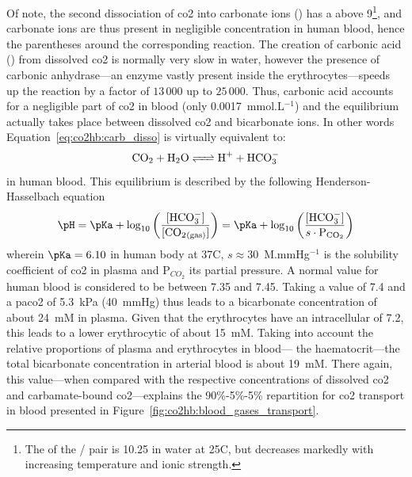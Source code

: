 Of note, the second dissociation of \gls{co2} into carbonate ions () has a \pKa{} above 9\footnote{The \pKa{} of the  /  pair is 10.25 in water at 25{\degree}C, but decreases markedly with increasing temperature and ionic strength\cite{hastings1925, macinnes1933}.}, and carbonate ions are thus present in negligible concentration in human blood, hence the parentheses around the corresponding reaction. The creation of carbonic acid () from dissolved \gls{co2} is normally very slow in water, however the presence of carbonic anhydrase---an enzyme vastly present inside the erythrocytes---speeds up the reaction by a factor of $13\,000$ up to $25\,000$\cite{levitzky2003pulmonary}\cite{geers2000}. Thus, carbonic acid accounts for a negligible part of \gls{co2} in blood (only 0.0017~mmol.L$^{-1}$\cite[Table~10.2]{nunns}) and the equilibrium actually takes place between dissolved \gls{co2} and bicarbonate ions. In other words Equation~\ref{eq:co2hb:carb_disso} is virtually equivalent to:
\begin{equation}\label{eq:co2hb:carb_disso_eq}
	\ce{CO2 + H2O <=> H+ + HCO^-_3}
\end{equation}
in human blood. This equilibrium is described by the following Henderson-Hasselbach equation
\begin{equation}\label{hh_eq_co2}
	\pH = \pKa + \log_{10} \left( \frac{\ce{[HCO^-_3]}}{\ce{[CO2_{(gas)}]}} \right) = \pKa + \log_{10} \left( \frac{\ce{[HCO^-_3]}}{s \cdot \mathrm{P}_{\ce{CO_2}}} \right)
\end{equation}
wherein $\pKa=6.10$ in human body at 37{\degree}C\cite{messier1975, geers2000}, $s \approx 30$~{\textmu}M.mmHg$^{-1}$ is the solubility coefficient of \gls{co2} in plasma\cite[Table~10.1]{nunns} and P$_{CO_2}$ its partial pressure. A normal \pH{} value for human blood is considered to be between 7.35 and 7.45\cite{rossana}. Taking a \pH{} value of 7.4 and a \gls{paco2} of 5.3~kPa (40~mmHg) thus leads to a bicarbonate concentration \ce{[HCO^-_3]} of about 24~mM in plasma. Given that the erythrocytes have an intracellular \pH{} of 7.2\cite{kummerow2000, jensen2004}, this leads to a lower erythrocytic \ce{[HCO^-_3]} of about 15~mM. Taking into account the relative proportions of plasma and erythrocytes in blood---\ie{} the haematocrit---the total bicarbonate concentration in arterial blood is about 19~mM. There again, this value---when compared with the respective concentrations of dissolved \gls{co2} and carbamate-bound \gls{co2}---explains the 90\%-5\%-5\% repartition for \gls{co2} transport in blood presented in Figure~\ref{fig:co2hb:blood_gases_transport}.


